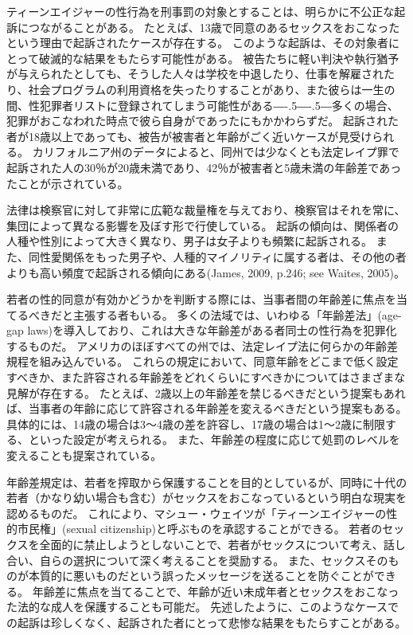 \documentclass[paper=a4,book,openany]{jlreq}
\def\DDASH{―\kern-.5\zw―\kern-.5\zw―} %
\begin{document}
ティーンエイジャーの性行為を刑事罰の対象とすることは、明らかに不公正な起訴につながることがある。
たとえば、13歳で同意のあるセックスをおこなったという理由で起訴されたケースが存在する。
このような起訴は、その対象者にとって破滅的な結果をもたらす可能性がある。
被告たちに軽い判決や執行猶予が与えられたとしても、そうした人々は学校を中退したり、仕事を解雇されたり、社会プログラムの利用資格を失ったりすることがあり、また彼らは一生の間、性犯罪者リストに登録されてしまう可能性がある{\DDASH}多くの場合、犯罪がおこなわれた時点で彼ら自身がであったにもかかわらずだ。
起訴された者が18歳以上であっても、被告が被害者と年齢がごく近いケースが見受けられる。
カリフォルニア州のデータによると、同州では少なくとも法定レイプ罪で起訴された人の30％が20歳未満であり、42％が被害者と5歳未満の年齢差であったことが示されている\citep[pp. 51--52]{ccasa2008}。

法律は検察官に対して非常に広範な裁量権を与えており、検察官はそれを常に、集団によって異なる影響を及ぼす形で行使している。
起訴の傾向は、関係者の人種や性別によって大きく異なり、男子は女子よりも頻繁に起訴される。
また、同性愛関係をもった男子や、人種的マイノリティに属する者は、その他の者よりも高い頻度で起訴される傾向にある(James, 2009, p.246; see Waites, 2005)。
\nocite{james09:_romeo_juliet_were_sex_offen}\nocite{waites04:_age_consen_sexual_consen}

若者の性的同意が有効かどうかを判断する際には、当事者間の年齢差に焦点を当てるべきだと主張する者もいる。
多くの法域では、いわゆる「年齢差法」(age-gap laws)を導入しており、これは大きな年齢差がある者同士の性行為を犯罪化するものだ。
アメリカのほぼすべての州では、法定レイプ法に何らかの年齢差規程を組み込んでいる。
これらの規定において、同意年齢をどこまで低く設定すべきか、また許容される年齢差をどれくらいにすべきかについてはさまざまな見解が存在する。
たとえば、2歳以上の年齢差を禁じるべきだという提案もあれば\citep{waites04:_age_consen_sexual_consen}、当事者の年齢に応じて許容される年齢差を変えるべきだという提案もある。
具体的には、14歳の場合は3～4歳の差を許容し、17歳の場合は1～2歳に制限する、といった設定が考えられる。
また、年齢差の程度に応じて処罰のレベルを変えることも提案されている。

年齢差規定は、若者を搾取から保護することを目的としているが、同時に十代の若者（かなり幼い場合も含む）がセックスをおこなっているという明白な現実を認めるものだ。
これにより、マシュー・ウェイツが「ティーンエイジャーの性的市民権」(sexual citizenship)と呼ぶものを承認することができる。
若者のセックスを全面的に禁止しようとしないことで、若者がセックスについて考え、話し合い、自らの選択について深く考えることを奨励する。
また、セックスそのものが本質的に悪いものだという誤ったメッセージを送ることを防ぐことができる。
年齢差に焦点を当てることで、年齢が近い未成年者とセックスをおこなった法的な成人を保護することも可能だ。
先述したように、このようなケースでの起訴は珍しくなく、起訴された者にとって悲惨な結果をもたらすことがある。
\end{document}
